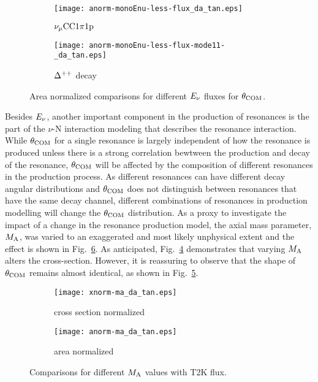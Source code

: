\begin{figure}[ht!]
    \centering
    \begin{subfigure}[ht!]{\scfigwid\textwidth}
        \centering
        \texttt{[image: anorm-monoEnu-less-flux\_da\_tan.eps]}
        \caption{$\nu_{\mu}\textrm{CC}1\pi1\textrm{p}$}
        \label{subfig:enu-comp-cc1pi1p}
    \end{subfigure}
        
    \begin{subfigure}[ht!]{\scfigwid\textwidth}
        \centering
        \texttt{[image: anorm-monoEnu-less-flux-mode11-\_da\_tan.eps]}
        \caption{$\Delta^{++}$ decay}
        \label{subfig:enu-comp-dpp}
    \end{subfigure}
    \caption{Area normalized comparisons for different $E_{\nu}$ fluxes for $\theta_{\textrm{COM}}$.}
    \label{fig:enu-comp}
\end{figure}

Besides $E_{\nu}$, another important component in the production of resonances is the part of the $\nu$-N interaction modeling that describes the resonance interaction. 
While $\theta_{\textrm{COM}}$ for a single resonance is largely independent of how the resonance is produced unless there is a strong correlation bewtween the production and decay of the resonance, $\theta_{\textrm{COM}}$ will be affected by the composition of different resonances in the production process. 
As different resonances can have different decay angular distributions and $\theta_{\textrm{COM}}$ does not distinguish between resonances that have the same decay channel, different combinations of resonances in production modelling will change the $\theta_{\textrm{COM}}$ distribution. 
As a proxy to investigate the impact of a change in the resonance production model, the axial mass parameter, $M_{\textrm{A}}$, was varied to an exaggerated and most likely unphysical extent and the effect is shown in Fig.~\ref{fig:ma-comp}. 
As anticipated, Fig.~\ref{subfig:ma-comp-xsec} demonstrates that varying $M_{\textrm{A}}$ alters the cross-section.
However, it is reassuring to observe that the shape of $\theta_{\textrm{COM}}$ remains almost identical, as shown in Fig.~\ref{subfig:ma-comp-area}. 

\begin{figure}
    \centering
    \begin{subfigure}[b]{\scfigwid\textwidth}
        \centering
        \texttt{[image: xnorm-ma\_da\_tan.eps]}
        \caption{cross section normalized}
        \label{subfig:ma-comp-xsec}
    \end{subfigure}
    \begin{subfigure}[b]{\scfigwid\textwidth}
        \centering
        \texttt{[image: anorm-ma\_da\_tan.eps]}
        \caption{area normalized}
        \label{subfig:ma-comp-area}
    \end{subfigure}
    \caption{Comparisons for different $M_{\textrm{A}}$ values with T2K flux. }
    \label{fig:ma-comp}
\end{figure}


